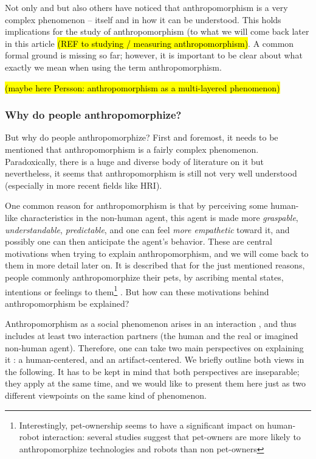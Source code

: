 \documentclass{frontiersSCNS} %
\begin{document}
Not only \cite{epley_when_2008} and \cite{duffy_anthropomorphism_2002} but also others have noticed that anthropomorphism is a very complex phenomenon -- itself and in how it can be understood. This holds implications for the study of anthropomorphism (to what we will come back later in this article \hl{(REF to studying / measuring anthropomorphism)}.
A common formal ground is missing so far; however, it is important to be clear about what exactly we mean when using the term anthropomorphism.

\hl{(maybe here Persson: anthropomorphism as a multi-layered phenomenon)}



\subsubsection{Why do people anthropomorphize?\\}
\label{sec:explanations}

But why do people anthropomorphize? First and foremost, it needs to be mentioned that anthropomorphism is a fairly complex phenomenon. Paradoxically, there is a huge and diverse body of literature on it but nevertheless, it seems that anthropomorphism is still not very well understood (especially in more recent fields like HRI).

One common reason for anthropomorphism is that by perceiving some human-like characteristics in the non-human agent, this agent is made more \emph{graspable}, \emph{understandable}, \emph{predictable}, and one can feel \emph{more empathetic} toward it, and possibly one can then anticipate the agent's behavior. These are central motivations when trying to explain anthropomorphism, and we will come back to them in more detail later on. 
It is described that for the just mentioned reasons, people commonly anthropomorphize their pets, by ascribing mental states, intentions or feelings to them\footnote{Interestingly, pet-ownership seems to have a significant impact on human-robot interaction: several studies suggest that pet-owners are more likely to anthropomorphize technologies and robots than non pet-owners} \cite{eddy_attribution_1993}. But how can these motivations behind anthropomorphism be explained?

Anthropomorphism as a social phenomenon arises in an interaction \citep{persson_anthropomorphism_2000}, and thus includes at least two interaction partners (the human and the real or imagined non-human agent). Therefore, one can take two main perspectives on explaining it \citep{lee_human_2005}: a human-centered, and an artifact-centered. We briefly outline both views in the following. It has to be kept in mind that both perspectives are inseparable; they apply at the same time, and we would like to present them here just as two different viewpoints on the same kind of phenomenon.
\end{document}
